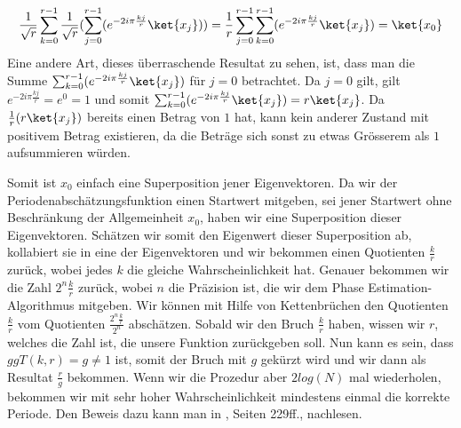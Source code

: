 \begin{align*}
    \frac{1}{\sqrt{r}}\sum_{k = 0}^{r - 1}\frac{1}{\sqrt{r}}(\sum_{j = 0}^{r - 1}(e^{-2i\pi\frac{kj}{r}}\ket{x_j})) = \frac{1}{r}\sum_{j = 0}^{r - 1}\sum_{k = 0}^{r - 1}(e^{-2i\pi\frac{kj}{r}}\ket{x_j}) = \ket{x_0}
\end{align*}
Eine andere Art, dieses überraschende Resultat zu sehen, ist, dass man die Summe $\sum_{k = 0}^{r - 1}(e^{-2i\pi\frac{kj}{r}}\ket{x_j})$ für $j = 0$ betrachtet. Da $j = 0$ gilt, gilt $e^{-2i\pi\frac{kj}{r}} = e^{0} = 1$ und somit $\sum_{k = 0}^{r - 1}(e^{-2i\pi\frac{kj}{r}}\ket{x_j}) = r\ket{x_j}$. Da $\frac{1}{r}(r\ket{x_j})$ bereits einen Betrag von $1$ hat, kann kein anderer Zustand mit positivem Betrag existieren, da die Beträge sich sonst zu etwas Grösserem als $1$ aufsummieren würden.

Somit ist $x_0$ einfach eine Superposition jener Eigenvektoren. Da wir der Periodenabschätzungsfunktion einen Startwert mitgeben, sei jener Startwert ohne Beschränkung der Allgemeinheit $x_0$, haben wir eine Superposition dieser Eigenvektoren. Schätzen wir somit den Eigenwert dieser Superposition ab, kollabiert sie in eine der Eigenvektoren und wir bekommen einen Quotienten $\frac{k}{r}$ zurück, wobei jedes $k$ die gleiche Wahrscheinlichkeit hat. Genauer bekommen wir die Zahl $2^n\frac{k}{r}$ zurück, wobei $n$ die Präzision ist, die wir dem Phase Estimation-Algorithmus mitgeben. Wir können mit Hilfe von Kettenbrüchen den Quotienten $\frac{k}{r}$ vom Quotienten $\frac{2^n\frac{k}{r}}{2^n}$ abschätzen. Sobald wir den Bruch $\frac{k}{r}$ haben, wissen wir $r$, welches die Zahl ist, die unsere Funktion zurückgeben soll. Nun kann es sein, dass $ggT(k, r) = g \neq 1$ ist, somit der Bruch mit $g$ gekürzt wird und wir dann als Resultat $\frac{r}{g}$ bekommen. Wenn wir die Prozedur aber $2log(N)$ mal wiederholen, bekommen wir mit sehr hoher Wahrscheinlichkeit mindestens einmal die korrekte Periode. Den Beweis dazu kann man in \cite{QC}, Seiten 229ff., nachlesen.

